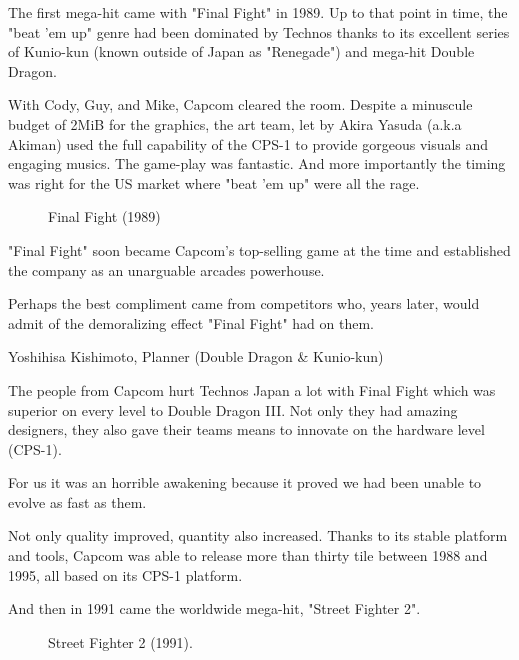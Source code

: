 The first mega-hit came with "Final Fight" in 1989. Up to that point in time, the "beat 'em up" genre had been dominated by Technos thanks to its excellent series of Kunio-kun (known outside of Japan as "Renegade") and mega-hit Double Dragon. 

With Cody, Guy, and Mike, Capcom cleared the room. Despite a minuscule budget of 2MiB for the graphics, the art team, let by Akira Yasuda (a.k.a Akiman) used the full capability of the CPS-1 to provide gorgeous visuals and engaging musics. The game-play was fantastic. And more importantly the timing was right for the US market where "beat 'em up" were all the rage.



  

\label{nin_ff}
 \begin{figure}[H]
\caption*{Final Fight (1989)}
\end{figure}

"Final Fight" soon became Capcom's top-selling game at the time\cite{birth_of_chunli} and established the company as an unarguable arcades powerhouse.

\pagebreak

Perhaps the best compliment came from competitors who, years later, would admit of the demoralizing effect "Final Fight" had on them.

\begin{q}{Yoshihisa Kishimoto, Planner (Double Dragon \& Kunio-kun)\cite{dd} }
  

  The people from Capcom hurt Technos Japan a lot with Final Fight which was superior on every level to Double Dragon III. Not only they had amazing designers, they also gave their teams means to innovate on the hardware level (CPS-1). 

  For us it was an horrible awakening because it proved we had been unable to evolve as fast as them.
  \end{q}



Not only quality improved, quantity also increased. Thanks to its stable platform and tools, Capcom was able to release more than thirty tile between 1988 and 1995, all based on its CPS-1 platform. 

And then in 1991 came the worldwide mega-hit, "Street Fighter 2".

\label{nin_sf2}
\begin{figure}[H]
\caption*{Street Fighter 2 (1991).}
\end{figure}

